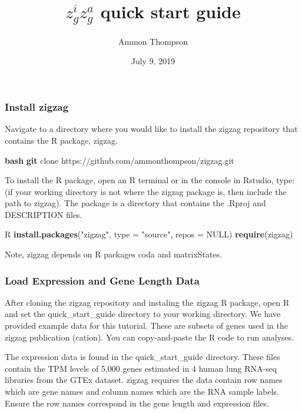 \documentclass[]{article}
\title{\(z^i_gz^a_g\) quick start guide}
\author{Ammon Thompson}
\date{July 9, 2019}
\newenvironment{Shaded}{\begin{snugshade}}{\end{snugshade}}
\newcommand{\KeywordTok}[1]{\textcolor[rgb]{0.13,0.29,0.53}{\textbf{{#1}}}}
\newcommand{\DataTypeTok}[1]{\textcolor[rgb]{0.13,0.29,0.53}{{#1}}}
\newcommand{\StringTok}[1]{\textcolor[rgb]{0.31,0.60,0.02}{{#1}}}
\newcommand{\OtherTok}[1]{\textcolor[rgb]{0.56,0.35,0.01}{{#1}}}
\newcommand{\NormalTok}[1]{{#1}}
\begin{document}
\maketitle

\subsubsection{Install zigzag}\label{install-zigzag}

Navigate to a directory where you would like to install the zigzag
repository that contains the R package, zigzag.

\begin{Shaded}
\begin{Highlighting}[]
\KeywordTok{bash}
\KeywordTok{git} \NormalTok{clone https://github.com/ammonthompson/zigzag.git}
\end{Highlighting}
\end{Shaded}

To install the R package, open an R terminal or in the console in
Rstudio, type: (if your working directory is not where the zigzag
package is, then include the path to zigzag). The package is a directory
that contains the .Rproj and DESCRIPTION files.

\begin{Shaded}
\begin{Highlighting}[]
\NormalTok{R}
\KeywordTok{install.packages}\NormalTok{(}\StringTok{"zigzag"}\NormalTok{, }\DataTypeTok{type =} \StringTok{"source"}\NormalTok{, }\DataTypeTok{repos =} \OtherTok{NULL}\NormalTok{)}
\KeywordTok{require}\NormalTok{(zigzag)}
\end{Highlighting}
\end{Shaded}

Note, zigzag depends on R packages coda and matrixStates.

\subsubsection{Load Expression and Gene Length
Data}\label{load-expression-and-gene-length-data}

After cloning the zigzag repository and instaling the zigzag R package,
open R and set the quick\_start\_guide directory to your working
directory. We have provided example data for this tutorial. These are
subsets of genes used in the zigzag publication (cation). You can
copy-and-paste the R code to run analyses.

The expression data is found in the quick\_start\_guide directory. These
files contain the TPM levels of 5,000 genes estimated in 4 human lung
RNA-seq libraries from the GTEx dataset. zigzag requires the data
contain row names which are gene names and column names which are the
RNA sample labels. Ensure the row names correspond in the gene length
and expression files.
\end{document}
